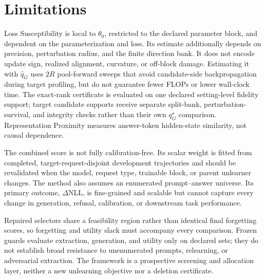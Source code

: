 \section{Limitations}
\label{sec:limitations}

Loss Susceptibility is local to $\theta_0$, restricted to the declared
parameter block, and dependent on the parameterization and loss. Its
estimate additionally depends on precision, perturbation radius, and the finite
direction bank. It does not encode update sign, realized alignment, curvature,
or off-block damage. Estimating it with $\widehat q_G$ uses $2R$ pool-forward
sweeps that avoid candidate-side
backpropagation during target profiling, but do not guarantee fewer FLOPs or
lower wall-clock time. The exact-rank certificate is evaluated on one declared
setting-level fidelity support; target candidate supports receive separate
split-bank, perturbation-survival, and integrity checks rather than their own
$q_G^\star$ comparison. Representation Proximity measures answer-token
hidden-state similarity, not causal dependence.

The combined score is not fully calibration-free. Its scalar weight is fitted
from completed, target-request-disjoint development trajectories and should be
revalidated when the model, request type, trainable block, or parent unlearner
changes. The method also assumes an enumerated prompt--answer universe. Its
primary outcome, $\Delta$NLL, is fine-grained and scalable but cannot capture
every change in generation, refusal, calibration, or downstream task
performance.

Repaired selectors share a feasibility region rather than identical final
forgetting scores, so forgetting and utility slack must accompany every
comparison. Frozen guards evaluate extraction, generation, and utility only
on declared sets; they do not establish broad resistance to unenumerated
prompts, relearning, or adversarial extraction. The framework is a
prospective screening and allocation layer, neither a new unlearning objective
nor a deletion certificate.
